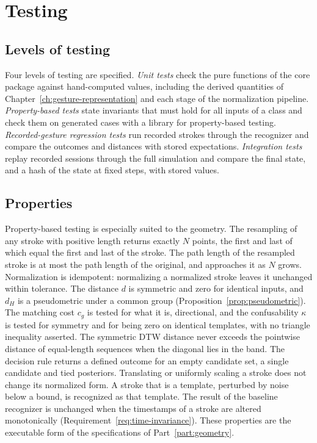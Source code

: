 \chapter{Testing}\label{ch:testing}

\section{Levels of testing}

Four levels of testing are specified. \emph{Unit tests} check the pure functions of the core package against hand-computed values, including the derived quantities of Chapter~\ref{ch:gesture-representation} and each stage of the normalization pipeline. \emph{Property-based tests} state invariants that must hold for all inputs of a class and check them on generated cases with a library for property-based testing. \emph{Recorded-gesture regression tests} run recorded strokes through the recognizer and compare the outcomes and distances with stored expectations. \emph{Integration tests} replay recorded sessions through the full simulation and compare the final state, and a hash of the state at fixed steps, with stored values.

\section{Properties}

Property-based testing is especially suited to the geometry. The resampling of any stroke with positive length returns exactly $N$ points, the first and last of which equal the first and last of the stroke. The path length of the resampled stroke is at most the path length of the original, and approaches it as $N$ grows. Normalization is idempotent: normalizing a normalized stroke leaves it unchanged within tolerance. The distance $d$ is symmetric and zero for identical inputs, and $d_H$ is a pseudometric under a common group (Proposition~\ref{prop:pseudometric}). The matching cost $c_g$ is tested for what it is, directional, and the confusability $\kappa$ is tested for symmetry and for being zero on identical templates, with no triangle inequality asserted. The symmetric DTW distance never exceeds the pointwise distance of equal-length sequences when the diagonal lies in the band. The decision rule returns a defined outcome for an empty candidate set, a single candidate and tied posteriors. Translating or uniformly scaling a stroke does not change its normalized form. A stroke that is a template, perturbed by noise below a bound, is recognized as that template. The result of the baseline recognizer is unchanged when the timestamps of a stroke are altered monotonically (Requirement~\ref{req:time-invariance}). These properties are the executable form of the specifications of Part~\ref{part:geometry}.

